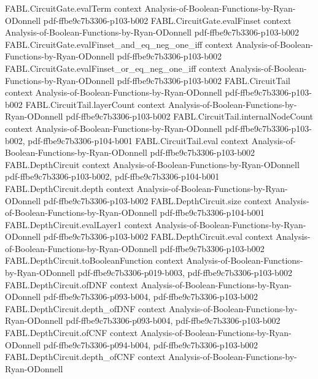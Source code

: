 \begin{theorem}
\proofstep
  {FABL.CircuitGate.evalTerm}
  {context}
  {Analysis-of-Boolean-Functions-by-Ryan-ODonnell}
  {pdf-ffbe9c7b3306-p103-b002}
\proofstep
  {FABL.CircuitGate.evalFinset}
  {context}
  {Analysis-of-Boolean-Functions-by-Ryan-ODonnell}
  {pdf-ffbe9c7b3306-p103-b002}
\proofstep
  {FABL.CircuitGate.evalFinset_and_eq_neg_one_iff}
  {context}
  {Analysis-of-Boolean-Functions-by-Ryan-ODonnell}
  {pdf-ffbe9c7b3306-p103-b002}
\proofstep
  {FABL.CircuitGate.evalFinset_or_eq_neg_one_iff}
  {context}
  {Analysis-of-Boolean-Functions-by-Ryan-ODonnell}
  {pdf-ffbe9c7b3306-p103-b002}
\proofstep
  {FABL.CircuitTail}
  {context}
  {Analysis-of-Boolean-Functions-by-Ryan-ODonnell}
  {pdf-ffbe9c7b3306-p103-b002}
\proofstep
  {FABL.CircuitTail.layerCount}
  {context}
  {Analysis-of-Boolean-Functions-by-Ryan-ODonnell}
  {pdf-ffbe9c7b3306-p103-b002}
\proofstep
  {FABL.CircuitTail.internalNodeCount}
  {context}
  {Analysis-of-Boolean-Functions-by-Ryan-ODonnell}
  {pdf-ffbe9c7b3306-p103-b002,
    pdf-ffbe9c7b3306-p104-b001}
\proofstep
  {FABL.CircuitTail.eval}
  {context}
  {Analysis-of-Boolean-Functions-by-Ryan-ODonnell}
  {pdf-ffbe9c7b3306-p103-b002}
\proofstep
  {FABL.DepthCircuit}
  {context}
  {Analysis-of-Boolean-Functions-by-Ryan-ODonnell}
  {pdf-ffbe9c7b3306-p103-b002,
    pdf-ffbe9c7b3306-p104-b001}
\proofstep
  {FABL.DepthCircuit.depth}
  {context}
  {Analysis-of-Boolean-Functions-by-Ryan-ODonnell}
  {pdf-ffbe9c7b3306-p103-b002}
\proofstep
  {FABL.DepthCircuit.size}
  {context}
  {Analysis-of-Boolean-Functions-by-Ryan-ODonnell}
  {pdf-ffbe9c7b3306-p104-b001}
\proofstep
  {FABL.DepthCircuit.evalLayer1}
  {context}
  {Analysis-of-Boolean-Functions-by-Ryan-ODonnell}
  {pdf-ffbe9c7b3306-p103-b002}
\proofstep
  {FABL.DepthCircuit.eval}
  {context}
  {Analysis-of-Boolean-Functions-by-Ryan-ODonnell}
  {pdf-ffbe9c7b3306-p103-b002}
\proofstep
  {FABL.DepthCircuit.toBooleanFunction}
  {context}
  {Analysis-of-Boolean-Functions-by-Ryan-ODonnell}
  {pdf-ffbe9c7b3306-p019-b003,
    pdf-ffbe9c7b3306-p103-b002}
\proofstep
  {FABL.DepthCircuit.ofDNF}
  {context}
  {Analysis-of-Boolean-Functions-by-Ryan-ODonnell}
  {pdf-ffbe9c7b3306-p093-b004,
    pdf-ffbe9c7b3306-p103-b002}
\proofstep
  {FABL.DepthCircuit.depth_ofDNF}
  {context}
  {Analysis-of-Boolean-Functions-by-Ryan-ODonnell}
  {pdf-ffbe9c7b3306-p093-b004,
    pdf-ffbe9c7b3306-p103-b002}
\proofstep
  {FABL.DepthCircuit.ofCNF}
  {context}
  {Analysis-of-Boolean-Functions-by-Ryan-ODonnell}
  {pdf-ffbe9c7b3306-p094-b004,
    pdf-ffbe9c7b3306-p103-b002}
\proofstep
  {FABL.DepthCircuit.depth_ofCNF}
  {context}
  {Analysis-of-Boolean-Functions-by-Ryan-ODonnell}

\end{theorem}

